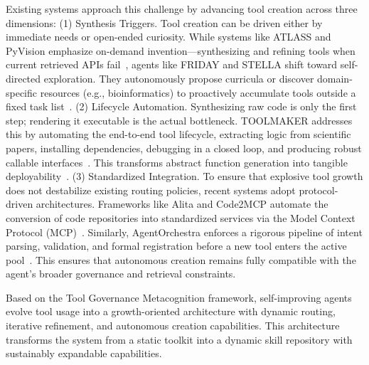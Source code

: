 \documentclass{article}
\begin{document}
Existing systems approach this challenge by advancing tool creation across three dimensions: (1) Synthesis Triggers. Tool creation can be driven either by immediate needs or open-ended curiosity. While systems like ATLASS and PyVision emphasize on-demand invention—synthesizing and refining tools  when current retrieved APIs fail~\citep{haque2025advancedtoollearningselection, zhao2025pyvisionagenticvisiondynamic}, agents like FRIDAY and STELLA shift toward self-directed exploration. They autonomously propose curricula or discover domain-specific resources (e.g., bioinformatics) to proactively accumulate tools outside a fixed task list~\citep{wu2024oscopilotgeneralistcomputeragents, jin2025stellaselfevolvingllmagent}. (2) Lifecycle Automation. Synthesizing raw code is only the first step; rendering it executable is the actual bottleneck. TOOLMAKER addresses this by automating the end-to-end tool lifecycle, extracting logic from scientific papers, installing dependencies, debugging in a closed loop, and producing robust callable interfaces~\citep{wölflein2025llmagentsmakingagent}. This transforms abstract function generation into tangible deployability~\citep{cai2024largelanguagemodelstool, yuan2024craftcustomizingllmscreating, qian2024creatortoolcreationdisentangling}. (3) Standardized Integration. To ensure that explosive tool growth does not destabilize existing routing policies, recent systems adopt protocol-driven architectures. Frameworks like Alita and Code2MCP automate the conversion of code repositories into standardized services via the Model Context Protocol (MCP)~\citep{qiu2025alitageneralistagentenabling, qiu2025alitagselfevolvinggenerativeagent, ouyang2025code2mcptransformingcoderepositories}. Similarly, AgentOrchestra enforces a rigorous pipeline of intent parsing, validation, and formal registration before a new tool enters the active pool~\citep{zhang2025agentorchestraorchestratinghierarchicalmultiagent}. This ensures that autonomous creation remains fully compatible with the agent's broader governance and retrieval constraints.



\begin{ttcolorbox}[Takeaway]
Based on the Tool Governance Metacognition framework, self-improving agents evolve tool usage into a growth-oriented architecture with dynamic routing, iterative refinement, and autonomous creation capabilities. This architecture transforms the system from a static toolkit into a dynamic skill repository with sustainably expandable capabilities.
\end{ttcolorbox}
\end{document}
